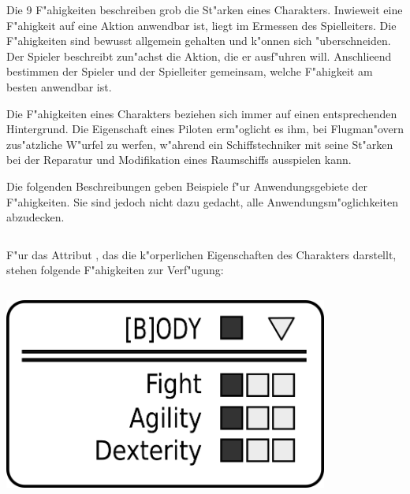 Die 9 F"ahigkeiten beschreiben grob die St"arken eines Charakters. Inwieweit eine F"ahigkeit auf eine Aktion anwendbar ist, liegt im Ermessen des Spielleiters. Die F"ahigkeiten sind bewusst allgemein gehalten und k"onnen sich "uberschneiden. Der Spieler beschreibt zun"achst die Aktion, die er ausf"uhren will. Anschlie\3end bestimmen der Spieler und der Spielleiter gemeinsam, welche F"ahigkeit am besten anwendbar ist.

Die F"ahigkeiten eines Charakters beziehen sich immer auf einen entsprechenden Hintergrund. Die Eigenschaft  eines Piloten erm"oglicht es ihm, bei Flugman"overn zus"atzliche W"urfel zu werfen, w"ahrend ein Schiffstechniker mit  seine St"arken bei der Reparatur und Modifikation eines Raumschiffs ausspielen kann.

Die folgenden Beschreibungen geben Beispiele f"ur Anwendungsgebiete der F"ahigkeiten. Sie sind jedoch nicht dazu gedacht, alle Anwendungsm"oglichkeiten abzudecken.

\medskip
\begin{column}[l]{0.55}
    F"ur das Attribut , das die k"orperlichen Eigenschaften des Charakters darstellt, stehen folgende F"ahigkeiten zur Verf"ugung:
\end{column}
\begin{column}[r]{0.45}
    \centering
    \includegraphics[width=0.80\textwidth]{images/character_body.png}
\end{column}

